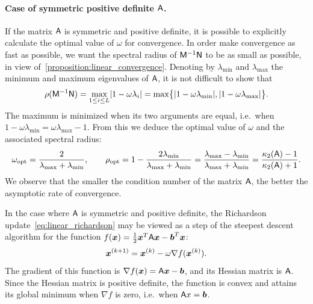\paragraph{Case of symmetric positive definite $\mathsf A$.}%
\label{par:case_of_symmetric_positive_definite_mat_a_}
If the matrix $\mathsf A$ is symmetric and positive definite,
it is possible to explicitly calculate the optimal value of $\omega$ for convergence.
In order make convergence as fast as possible,
we want the spectral radius of $\mathsf M^{-1} \mathsf N$ to be as small as possible,
in view of~\cref{proposition:linear_convergence}.
Denoting by $\lambda_{\min}$ and $\lambda_{\max}$ the minimum and maximum eigenvalues of $\mathsf A$,
it is not difficult to show that
\[
    \rho(\mathsf M^{-1} \mathsf N)
    = \max_{1 \leq i \leq L} \lvert1  - \omega \lambda_i\rvert
    = \max \bigl\{ \lvert1 - \omega \lambda_{\min}\rvert, \lvert1 - \omega \lambda_{\max}\rvert\bigr\}.
\]
The maximum is minimized when its two arguments are equal,
i.e.\ when $1 - \omega \lambda_{\min} = \omega \lambda_{\max} -1$.
From this we deduce the optimal value of $\omega$ and the associated spectral radius:
\[
    \omega_{\rm opt} = \frac{2}{\lambda_{\max} + \lambda_{\min}},
    \qquad
    \rho_{\rm opt}
    = 1 - \frac{2\lambda_{\min}}{\lambda_{\max} + \lambda_{\min}}
    = \frac{\lambda_{\max} - \lambda_{\min}}{\lambda_{\max} + \lambda_{\min}}
    =  \frac{\kappa_2(\mathsf A) - 1}{\kappa_2(\mathsf A) + 1}.
\]
We observe that the smaller the condition number of the matrix $\mathsf A$,
the better the asymptotic rate of convergence.

\begin{remark}
    \label{remark:linear_link_optimization}
    In the case where $\mathsf A$ is symmetric and positive definite,
    the Richardson update~\eqref{eq:linear_richardson} may be viewed as a step of the steepest descent algorithm
    for the function $f(\mathbf{\boldsymbol{x}}) = \frac{1}{2} \mathbf{\boldsymbol{x}}^T \mathsf A \mathbf{\boldsymbol{x}} - \mathbf{\boldsymbol{b}}^T \mathbf{\boldsymbol{x}}$:
    \begin{equation}
        \label{eq:linear_richardson_gradient}
        \mathbf{\boldsymbol{x}}^{(k+1)} = \mathbf{\boldsymbol{x}}^{(k)} - \omega \nabla f(\mathbf{\boldsymbol{x}}^{(k)}).
    \end{equation}
    The gradient of this function is $\nabla f(\mathbf{\boldsymbol{x}}) = \mathsf A \mathbf{\boldsymbol{x}} - \mathbf{\boldsymbol{b}}$,
    and its Hessian matrix is $\mathsf A$.
    Since the Hessian matrix is positive definite, the function is convex
    and attains its global minimum when $\nabla f$ is zero,
    i.e.\ when $\mathsf A x = \mathbf{\boldsymbol{b}}$.
\end{remark}

